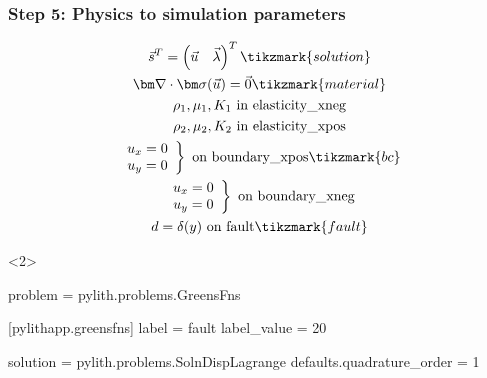 \documentclass{beamer}
\begin{document}
\begin{frame}[t,fragile]
  \frametitle{Step 5: Physics to simulation parameters}
  \summary{}

  \begin{minipage}[t]{0.35\textwidth}
    {\scriptsize
    \begin{gather*}
    \vec{s}^T = \left( \vec{u} \quad \vec{\lambda} \right)^T \tikzmark{solution}\\
    \tensor{\nabla} \cdot \tensor{\sigma}(\vec{u}) = \vec{0} \tikzmark{material} \\
    \rho_1, \mu_1, K_1 \text{ in elasticity\_xneg} \\ 
    \rho_2, \mu_2, K_2 \text{ in elasticity\_xpos} \\ 
    \left. \begin{array}{c} u_x = 0 \\ u_y = 0 \end{array}\right\} \text{ on boundary\_xpos} \tikzmark{bc}\\
    \left. \begin{array}{c} u_x = 0 \\ u_y = 0 \end{array}\right\} \text{ on boundary\_xneg} \\
    d = \delta(y) \text{ on fault} \tikzmark{fault}
    \end{gather*}}
  \end{minipage}
  \hfill
  \begin{minipage}[t]{0.60\textwidth}
    \begin{onlyenv}<2>
      \begin{cfgcode}
        [pylithapp]
        problem = pylith.problems.GreensFns

        [pylithapp.greensfns]
        label = fault
        label_value = 20

        solution = pylith.problems.SolnDispLagrange
        defaults.quadrature_order = 1
        

\end{cfgcode}
\end{onlyenv}
\end{minipage}
\end{frame}
\end{document}
